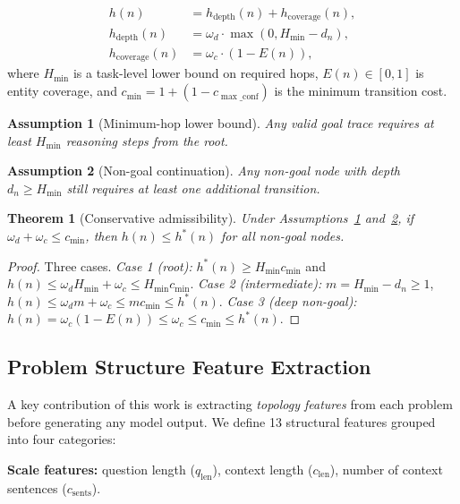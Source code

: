 \documentclass[11pt]{article}
\newtheorem{theorem}{Theorem}
\newtheorem{assumption}{Assumption}
\begin{document}
\begin{align}
  h(n) &= h_{\mathrm{depth}}(n) + h_{\mathrm{coverage}}(n), \label{eq:heuristic}\\
  h_{\mathrm{depth}}(n) &= \omega_d \cdot \max(0, H_{\min} - d_n), \label{eq:hdepth}\\
  h_{\mathrm{coverage}}(n) &= \omega_c \cdot (1 - E(n)), \label{eq:hcover}
\end{align}
where $H_{\min}$ is a task-level lower bound on required hops, $E(n) \in [0,1]$ is entity coverage, and
$c_{\min} = 1 + (1 - c_{\max\_\mathrm{conf}})$
is the minimum transition cost.

\begin{assumption}[Minimum-hop lower bound]
\label{asm:minhop}
Any valid goal trace requires at least $H_{\min}$ reasoning steps from the root.
\end{assumption}

\begin{assumption}[Non-goal continuation]
\label{asm:nongocal}
Any non-goal node with depth $d_n \ge H_{\min}$ still requires at least one additional transition.
\end{assumption}

\begin{theorem}[Conservative admissibility]
\label{thm:admissibility}
Under Assumptions~\ref{asm:minhop} and~\ref{asm:nongocal}, if $\omega_d + \omega_c \le c_{\min}$, then $h(n) \le h^*(n)$ for all non-goal nodes.
\end{theorem}
\begin{proof}
Three cases. \textit{Case 1 (root):} $h^*(n) \ge H_{\min}c_{\min}$ and $h(n) \le \omega_d H_{\min} + \omega_c \le H_{\min}c_{\min}$.
\textit{Case 2 (intermediate):} $m = H_{\min} - d_n \ge 1$, $h(n) \le \omega_d m + \omega_c \le mc_{\min} \le h^*(n)$.
\textit{Case 3 (deep non-goal):} $h(n) = \omega_c(1-E(n)) \le \omega_c \le c_{\min} \le h^*(n)$.
\end{proof}

\subsection{Problem Structure Feature Extraction}
\label{sec:features}

A key contribution of this work is extracting \emph{topology features} from each problem before generating any model output. We define 13 structural features grouped into four categories:

\textbf{Scale features:} question length ($q_{\mathrm{len}}$), context length ($c_{\mathrm{len}}$), number of context sentences ($c_{\mathrm{sents}}$).
\end{document}
